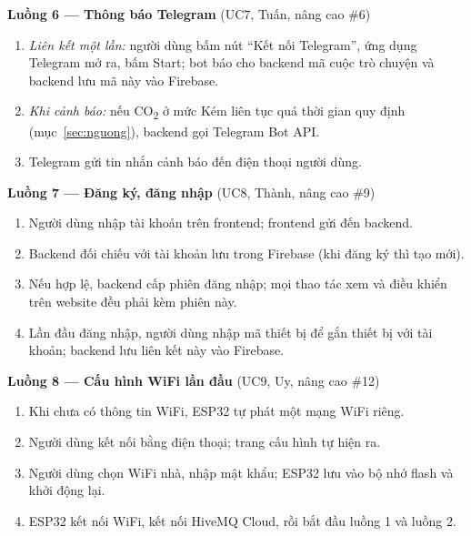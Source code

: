 \documentclass[12pt,a4paper]{article}
\begin{document}
\noindent\begin{minipage}{\linewidth}
\setlength{\parskip}{4pt}
\textbf{Luồng 6 --- Thông báo Telegram} (UC7, Tuấn, nâng cao \#6)
\begin{enumerate}[leftmargin=2em]
  \item \emph{Liên kết một lần:} người dùng bấm nút ``Kết nối Telegram'', ứng dụng Telegram mở ra, bấm Start; bot báo cho backend mã cuộc trò chuyện và backend lưu mã này vào Firebase.
  \item \emph{Khi cảnh báo:} nếu CO\textsubscript{2} ở mức Kém liên tục quá thời gian quy định (mục~\ref{sec:nguong}), backend gọi Telegram Bot API.
  \item Telegram gửi tin nhắn cảnh báo đến điện thoại người dùng.
\end{enumerate}
\end{minipage}
\par\medskip

\noindent\begin{minipage}{\linewidth}
\setlength{\parskip}{4pt}
\textbf{Luồng 7 --- Đăng ký, đăng nhập} (UC8, Thành, nâng cao \#9)
\begin{enumerate}[leftmargin=2em]
  \item Người dùng nhập tài khoản trên frontend; frontend gửi đến backend.
  \item Backend đối chiếu với tài khoản lưu trong Firebase (khi đăng ký thì tạo mới).
  \item Nếu hợp lệ, backend cấp phiên đăng nhập; mọi thao tác xem và điều khiển trên website đều phải kèm phiên này.
  \item Lần đầu đăng nhập, người dùng nhập mã thiết bị để gắn thiết bị với tài khoản; backend lưu liên kết này vào Firebase.
\end{enumerate}
\end{minipage}
\par\medskip

\noindent\begin{minipage}{\linewidth}
\setlength{\parskip}{4pt}
\textbf{Luồng 8 --- Cấu hình WiFi lần đầu} (UC9, Uy, nâng cao \#12)
\begin{enumerate}[leftmargin=2em]
  \item Khi chưa có thông tin WiFi, ESP32 tự phát một mạng WiFi riêng.
  \item Người dùng kết nối bằng điện thoại; trang cấu hình tự hiện ra.
  \item Người dùng chọn WiFi nhà, nhập mật khẩu; ESP32 lưu vào bộ nhớ flash và khởi động lại.
  \item ESP32 kết nối WiFi, kết nối HiveMQ Cloud, rồi bắt đầu luồng 1 và luồng 2.
\end{enumerate}
\end{minipage}
\par\bigskip
\end{document}
